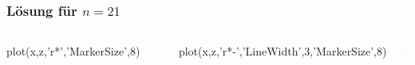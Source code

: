 \documentclass[hyperref={xetex}]{beamer}
\begin{document}
%
%
\begin{frame}[fragile]\frametitle{Lösung für $n=21$}
\begin{columns}[c]
\begin{matlabin}[basicstyle=\tiny]
plot(x,z,'r*','MarkerSize',8)
\end{matlabin}
\includegraphics[width=\textwidth]{figures/bild1_27_10}

\begin{matlabin}[basicstyle=\tiny]
plot(x,z,'r*-','LineWidth',3,'MarkerSize',8)
\end{matlabin}%
\includegraphics[width=\textwidth]{figures/bild2_27_10}
\end{columns}
\end{frame}
\end{document}
